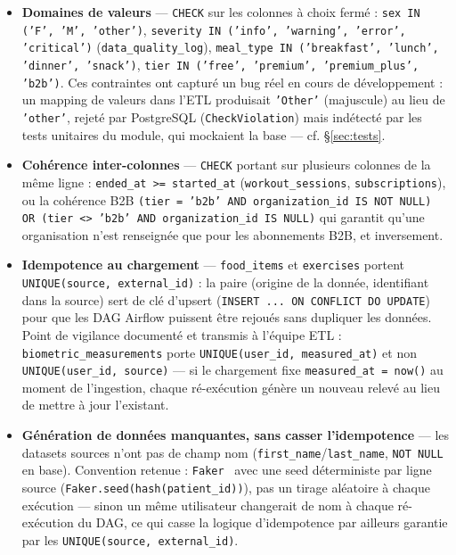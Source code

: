 \documentclass{article}
\begin{document}
\begin{itemize}[leftmargin=1.4em]
  \item \textbf{Domaines de valeurs} — \texttt{CHECK} sur les colonnes à choix fermé : \texttt{sex IN ('F', 'M', 'other')}, \texttt{severity IN ('info', 'warning', 'error', 'critical')} (\texttt{data\_quality\_log}), \texttt{meal\_type IN ('breakfast', 'lunch', 'dinner', 'snack')}, \texttt{tier IN ('free', 'premium', 'premium\_plus', 'b2b')}. Ces contraintes ont capturé un bug réel en cours de développement : un mapping de valeurs dans l'ETL produisait \texttt{'Other'} (majuscule) au lieu de \texttt{'other'}, rejeté par PostgreSQL (\texttt{CheckViolation}) mais indétecté par les tests unitaires du module, qui mockaient la base — cf. \S\ref{sec:tests}.

  \item \textbf{Cohérence inter-colonnes} — \texttt{CHECK} portant sur plusieurs colonnes de la même ligne : \texttt{ended\_at >= started\_at} (\texttt{workout\_sessions}, \texttt{subscriptions}), ou la cohérence B2B \texttt{(tier = 'b2b' AND organization\_id IS NOT NULL) OR (tier <> 'b2b' AND organization\_id IS NULL)} qui garantit qu'une organisation n'est renseignée que pour les abonnements B2B, et inversement.

  \item \textbf{Idempotence au chargement} — \texttt{food\_items} et \texttt{exercises} portent \texttt{UNIQUE(source, external\_id)} : la paire (origine de la donnée, identifiant dans la source) sert de clé d'upsert (\texttt{INSERT ... ON CONFLICT DO UPDATE}) pour que les DAG Airflow puissent être rejoués sans dupliquer les données. Point de vigilance documenté et transmis à l'équipe ETL : \texttt{biometric\_measurements} porte \texttt{UNIQUE(user\_id, measured\_at)} et non \texttt{UNIQUE(user\_id, source)} — si le chargement fixe \texttt{measured\_at = now()} au moment de l'ingestion, chaque ré-exécution génère un nouveau relevé au lieu de mettre à jour l'existant.

  \item \textbf{Génération de données manquantes, sans casser l'idempotence} — les datasets sources n'ont pas de champ nom (\texttt{first\_name}/\texttt{last\_name}, \texttt{NOT NULL} en base). Convention retenue : \texttt{Faker}~\citep{faker} avec une seed déterministe par ligne source (\texttt{Faker.seed(hash(patient\_id))}), pas un tirage aléatoire à chaque exécution — sinon un même utilisateur changerait de nom à chaque ré-exécution du DAG, ce qui casse la logique d'idempotence par ailleurs garantie par les \texttt{UNIQUE(source, external\_id)}.
\end{itemize}
\end{document}
